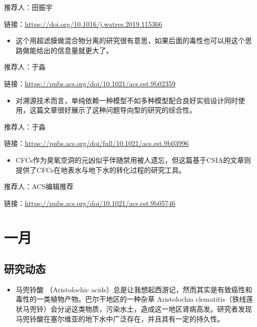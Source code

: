 \documentclass[
]{book}
\providecommand{\tightlist}{%
  \setlength{\itemsep}{0pt}\setlength{\parskip}{0pt}}
\begin{document}
推荐人：田振宇

链接：\url{https://doi.org/10.1016/j.watres.2019.115366}

\begin{itemize}
\tightlist
\item
  这个用超滤膜做混合物分离的研究很有意思，如果后面的毒性也可以用这个思路做能给出的信息量就更大了。
\end{itemize}

推荐人：于淼

链接：\url{https://pubs.acs.org/doi/10.1021/acs.est.9b02359}

\begin{itemize}
\tightlist
\item
  对溯源技术而言，单纯依赖一种模型不如多种模型配合良好实验设计同时使用，这篇文章很好展示了这种问题导向型的研究的综合性。
\end{itemize}

推荐人：于淼

链接：\url{https://pubs.acs.org/doi/full/10.1021/acs.est.9b03996}

\begin{itemize}
\tightlist
\item
  CFCs作为臭氧空洞的元凶似乎伴随禁用被人遗忘，但这篇基于CSIA的文章则提供了CFCs在地表水与地下水的转化过程的研究工具。
\end{itemize}

推荐人：ACS编辑推荐

链接：\url{https://pubs.acs.org/doi/10.1021/acs.est.9b05746}

\hypertarget{ux4e00ux6708-2}{%
\section*{一月}\label{ux4e00ux6708-2}}

\hypertarget{ux7814ux7a76ux52a8ux6001-26}{%
\subsection*{研究动态}\label{ux7814ux7a76ux52a8ux6001-26}}

\begin{itemize}
\tightlist
\item
  马兜铃酸 （Aristolochic acids）总是让我想起西游记，然而其实是有致癌性和毒性的一类植物产物。巴尔干地区的一种杂草 Aristolochia clematitis（铁线莲状马兜铃）会分泌这类物质，污染水土，造成这一地区肾病高发。研究者发现马兜铃酸在塞尔维亚的地下水中广泛存在，并且具有一定的持久性。
\end{itemize}
\end{document}
